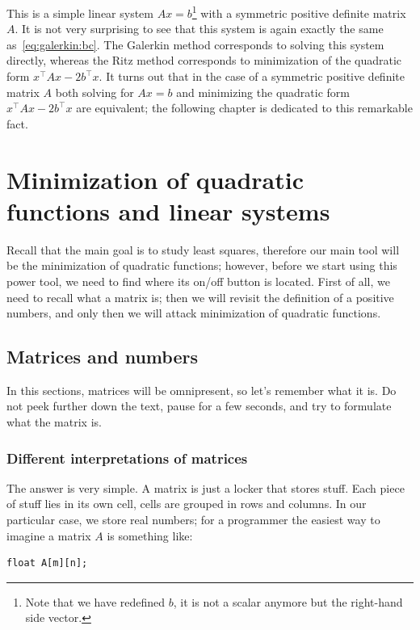 \documentclass[notitlepage,oneside]{book}
\makeatletter
\newcommand{\authoredby}[1]{\addtocontents{toc}{\protect\@nameuse{authoredby#1}}}%
\makeatother
\begin{document}
This is a simple linear system $Ax=b$\footnote{Note that we have redefined $b$, it is not a scalar anymore but the right-hand side vector.} with a symmetric positive definite matrix $A$.
It is not very surprising to see that this system is again exactly the same as~\eqref{eq:galerkin:bc}.
The Galerkin method corresponds to solving this system directly, whereas the Ritz method corresponds to minimization of the quadratic form $x^\top A x - 2b^\top x$.
It turns out that in the case of a symmetric positive definite matrix $A$ both solving for $Ax=b$ and minimizing the quadratic form $x^\top A x - 2b^\top x$ are equivalent;
the following chapter is dedicated to this remarkable fact.

\authoredby{B}
\chapter{Minimization of quadratic functions and linear systems}
\fancyhead[R]{\textcolor{ao(english)}{core text}}
\label{sec:mineqlin}

Recall that the main goal is to study least squares, therefore our main tool will be the minimization of quadratic functions;
however, before we start using this power tool, we need to find where its on/off button is located.
First of all, we need to recall what a matrix is; then we will revisit the definition of a positive numbers, and only then we will attack minimization of quadratic functions.

\section{Matrices and numbers}
In this sections, matrices will be omnipresent, so let's remember what it is.
Do not peek further down the text, pause for a few seconds, and try to formulate what the matrix is.

\subsection{Different interpretations of matrices}

The answer is very simple. A matrix is just a locker that stores stuff.
Each piece of stuff lies in its own cell, cells are grouped in rows and columns.
In our particular case, we store real numbers; for a programmer the easiest way to imagine a matrix $A$ is something like:
\begin{verbatim}
float A[m][n];
\end{verbatim}
\end{document}
